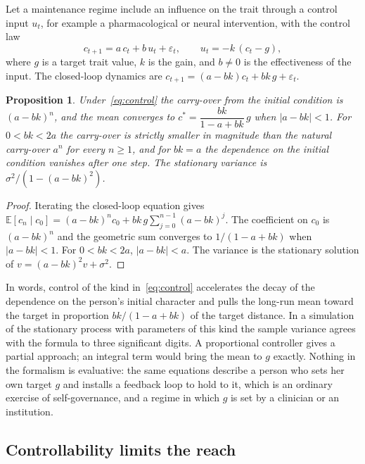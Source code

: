 \documentclass[11pt]{article}
\theoremstyle{plain}
\newtheorem{proposition}{Proposition}
\theoremstyle{definition}
\theoremstyle{remark}
\newcommand{\E}{\mathbb{E}}
\begin{document}
Let a maintenance regime include an influence on the trait through a control input $u_t$, for example a pharmacological or neural intervention, with the control law
\begin{equation}\label{eq:control}
c_{t+1}=a\,c_t+b\,u_t+\varepsilon_t,\qquad u_t=-k\,(c_t-g),
\end{equation}
where $g$ is a target trait value, $k$ is the gain, and $b\ne0$ is the effectiveness of the input. The closed-loop dynamics are $c_{t+1}=(a-bk)c_t+bk\,g+\varepsilon_t$.

\begin{proposition}\label{prop:control}
Under~\eqref{eq:control} the carry-over from the initial condition is $(a-bk)^n$, and the mean converges to $c^\ast=\dfrac{bk}{1-a+bk}\,g$ when $|a-bk|<1$. For $0<bk<2a$ the carry-over is strictly smaller in magnitude than the natural carry-over $a^n$ for every $n\ge1$, and for $bk=a$ the dependence on the initial condition vanishes after one step. The stationary variance is $\sigma^2/(1-(a-bk)^2)$.
\end{proposition}

\begin{proof}
Iterating the closed-loop equation gives $\E[c_n\mid c_0]=(a-bk)^nc_0+bk\,g\sum_{j=0}^{n-1}(a-bk)^j$. The coefficient on $c_0$ is $(a-bk)^n$ and the geometric sum converges to $1/(1-a+bk)$ when $|a-bk|<1$. For $0<bk<2a$, $|a-bk|<a$. The variance is the stationary solution of $v=(a-bk)^2v+\sigma^2$.
\end{proof}

In words, control of the kind in~\eqref{eq:control} accelerates the decay of the dependence on the person's initial character and pulls the long-run mean toward the target in proportion $bk/(1-a+bk)$ of the target distance. In a simulation of the stationary process with parameters of this kind the sample variance agrees with the formula to three significant digits. A proportional controller gives a partial approach; an integral term would bring the mean to $g$ exactly. Nothing in the formalism is evaluative: the same equations describe a person who sets her own target $g$ and installs a feedback loop to hold to it, which is an ordinary exercise of self-governance, and a regime in which $g$ is set by a clinician or an institution.

\subsection{Controllability limits the reach}
\end{document}
